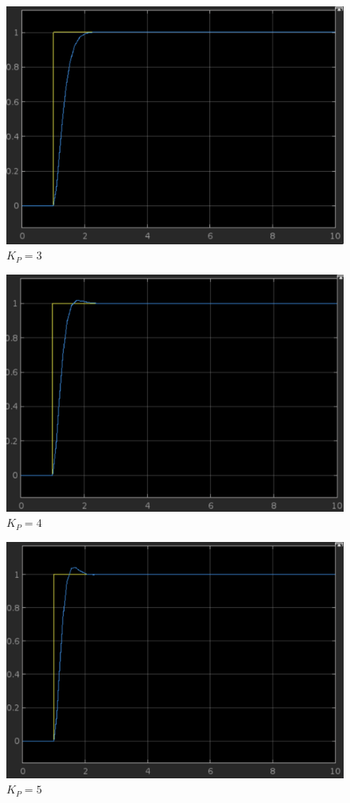 \documentclass{article}
\begin{document}
				\begin{figure}[h]
					\includegraphics[scale=0.225, center]{2_b_2_KP_3.png}
					\caption{$K_P = 3$}
					\label{fig7: Graph_KP_3}
				\end{figure}
				\begin{figure}[h]
					\includegraphics[scale=0.225, center]{2_b_2_KP_4.png}
					\caption{$K_P = 4$}
					\label{fig8: Graph_KP_4}
				\end{figure}
\newpage
				\begin{figure}[h]
					\includegraphics[scale=0.225, center]{2_b_2_KP_5.png}
					\caption{$K_P = 5$}
					\label{fig9: Graph_KP_5}
				\end{figure}
\end{document}
